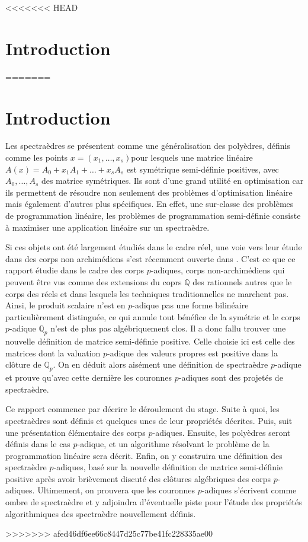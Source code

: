 <<<<<<< HEAD
\section*{Introduction} 
=======
\section{Introduction} 
Les spectraèdres se présentent comme une généralisation des polyèdres, définis comme les points $x = (x_1,\ldots,x_s)$pour lesquels une matrice linéaire $A(x) = A_0 + x_1A_1+\ldots+x_s A_s$ est symétrique semi-définie positives, avec $A_0,\ldots,A_s$ des matrice symétriques. Ils sont d'une grand utilité en optimisation car ils permettent de résoudre non seulement des problèmes d'optimisation linéaire mais également d'autres plus spécifiques. En effet, une sur-classe des problèmes de programmation linéaire, les problèmes de programmation semi-définie consiste à maximiser une application linéaire sur un spectraèdre.

Si ces objets ont été largement étudiés dans le cadre réel, une voie vers leur étude dans des corps non archimédiens s'est récemment ouverte dans \cite{allamigeon_tropical_2020}. C'est ce que ce rapport étudie dans le cadre des corps $p$-adiques, corps non-archimédiens qui peuvent être vus comme des extensions du coprs $\mathbb{Q}$ des rationnels autres que le corps des réels et dans lesquels les techniques traditionnelles ne marchent pas. Ainsi, le produit scalaire n'est en $p$-adique pas une forme bilinéaire particulièrement distinguée, ce qui annule tout bénéfice de la symétrie et le corps $p$-adique $\mathbb{Q}_{p}$ n'est de plus pas algébriquement clos. Il a donc fallu trouver une nouvelle définition de matrice semi-définie positive. Celle choisie ici est celle des matrices dont la valuation $p$-adique des valeurs propres est positive dans la clôture de $\mathbb{Q}_{p}$. On en déduit alors aisément une définition de spectraèdre $p$-adique et prouve qu'avec cette dernière les couronnes $p$-adiques sont des projetés de spectraèdre.


Ce rapport commence par décrire le déroulement du stage. Suite à quoi, les spectraèdres sont définis et quelques unes de leur propriétés décrites. Puis, suit une présentation élémentaire des corps $p$-adiques. Ensuite, les polyèdres seront définis dans le cas $p$-adique, et un algorithme résolvant le problème de la programmation linéaire sera décrit. Enfin, on y construira une définition des spectraèdre $p$-adiques, basé sur la nouvelle définition de matrice semi-définie positive après avoir brièvement discuté des clôtures algébriques des corps $p$-adiques. Ultimement, on prouvera que les couronnes $p$-adiques s'écrivent comme ombre de spectraèdre et y adjoindra d'éventuelle piste pour l'étude des propriétés algorithmiques des spectraèdre nouvellement définis.

>>>>>>> afed46df6ee66c8447d25c77be41fc228335ae00
